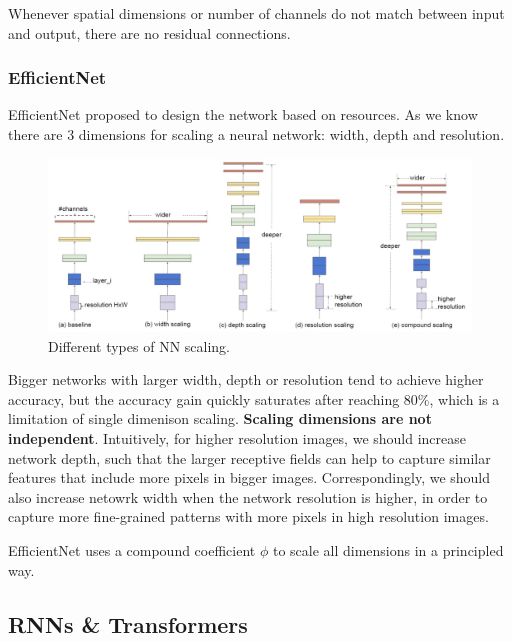 \documentclass{article}
\begin{document}
Whenever spatial dimensions or number of channels do not match between input and output, there are no residual connections.

\subsubsection{EfficientNet}
EfficientNet proposed to design the network based on resources.
As we know there are 3 dimensions for scaling a neural network: width, depth and resolution.

\begin{figure}[htbp]
  \centering
  \includegraphics[width=0.8\linewidth]{./img/efficientnet.jpg}
  \caption{Different types of NN scaling.}
\end{figure}

Bigger networks with larger width, depth or resolution tend to achieve higher accuracy, but the accuracy gain quickly saturates after reaching $80 \%$, which is a limitation of single dimenison scaling.
\textbf{Scaling dimensions are not independent}. Intuitively, for higher resolution images, we should increase network depth, such that the larger receptive fields can help to capture similar features that include more pixels in bigger images.
Correspondingly, we should also increase netowrk width when the network resolution is higher, in order to capture more fine-grained patterns with more pixels in high resolution images.

EfficientNet  uses a compound coefficient $\phi$ to scale all dimensions in a principled way.

\subsection{RNNs \& Transformers}
\end{document}
